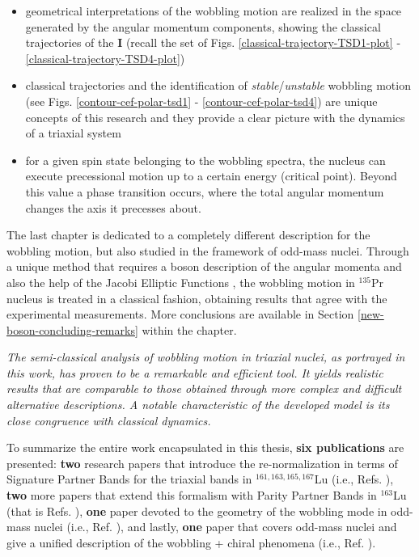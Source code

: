 \begin{itemize}
    \item geometrical interpretations of the wobbling motion are realized in the space generated by the angular momentum components, showing the classical trajectories of the $\mathbf{I}$ (recall the set of Figs. \ref{classical-trajectory-TSD1-plot} - \ref{classical-trajectory-TSD4-plot})
    \item classical trajectories and the identification of \emph{stable}/\emph{unstable} wobbling motion (see Figs. \ref{contour-cef-polar-tsd1} - \ref{contour-cef-polar-tsd4}) are unique concepts of this research and they provide a clear picture with the dynamics of a triaxial system
    \item for a given spin state belonging to the wobbling spectra, the nucleus can execute precessional motion up to a certain energy (critical point). Beyond this value a phase transition occurs, where the total angular momentum changes the axis it precesses about.
\end{itemize}

The last chapter is dedicated to a completely different description for the wobbling motion, but also studied in the framework of odd-mass nuclei. Through a unique method that requires a boson description of the angular momenta and also the help of the Jacobi Elliptic Functions \cite{jacobi1829fundamenta}, the wobbling motion in $^{135}$Pr nucleus is treated in a classical fashion, obtaining results that agree with the experimental measurements. More conclusions are available in Section \ref{new-boson-concluding-remarks} within the chapter.

\emph{The semi-classical analysis of wobbling motion in triaxial nuclei, as portrayed in this work, has proven to be a remarkable and efficient tool. It yields realistic results that are comparable to those obtained through more complex and difficult alternative descriptions. A notable characteristic of the developed model is its close congruence with classical dynamics.}

To summarize the entire work encapsulated in this thesis, \textbf{six publications} are presented: \textbf{two} research papers that introduce the re-normalization in terms of Signature Partner Bands for the triaxial bands in $^{161,163,165,167}$Lu (i.e., Refs. \cite{raduta2020approach,raduta2020towards}), \textbf{two} more papers that extend this formalism with Parity Partner Bands in $^{163}$Lu (that is Refs. \cite{poenaru2021parity,poenaru2021extensive1}), \textbf{one} paper devoted to the geometry of the wobbling mode in odd-mass nuclei (i.e., Ref. \cite{poenaru2021extensive2}), and lastly, \textbf{one} paper that covers odd-mass nuclei and give a unified description of the wobbling + chiral phenomena (i.e., Ref. \cite{raduta2020new}). %

